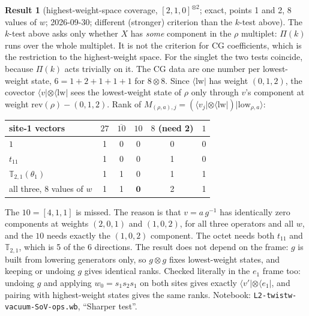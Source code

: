 \documentclass[11pt]{article}
\newcommand{\nb}[1]{\texttt{#1}}
\theoremstyle{definition}
\newtheorem{result}{Result}
\theoremstyle{remark}
\begin{document}
\begin{result}[{highest-weight-space coverage, $[2,1,0]^{\otimes2}$; exact, points 1 and 2, 8 values of $w$; 2026-09-30; different (stronger) criterion than the $k$-test above}]
The $k$-test above asks only whether $X$ has \emph{some} component in the $\rho$ multiplet: $\Pi(k)$ runs over the whole multiplet. It is not the criterion for CG coefficients, which is the restriction to the highest-weight space. For the singlet the two tests coincide, because $\Pi(k)$ acts trivially on it. The CG data are one number per lowest-weight state, $6=1+2+1+1+1$ for $8\otimes8$. Since $\langle\mathrm{lw}|$ has weight $(0,1,2)$, the covector $\langle v|\otimes\langle\mathrm{lw}|$ sees the lowest-weight state of $\rho$ only through $v$'s component at weight $\mathrm{rev}(\rho)-(0,1,2)$. Rank of $M_{(\rho,a),j}=(\langle v_j|\otimes\langle\mathrm{lw}|)|\mathrm{low}_{\rho,a}\rangle$:
\begin{center}
\begin{tabular}{lccccc}\toprule
site-1 vectors & $27$ & $\overline{10}$ & $10$ & $8$ (need 2) & $1$\\\midrule
$1$ & 1 & 0 & 0 & 0 & 0\\
$t_{11}$ & 1 & 0 & 0 & 1 & 0\\
$\mathbb T_{2,1}(\theta_1)$ & 1 & 1 & 0 & 1 & 1\\
all three, 8 values of $w$ & 1 & 1 & $\mathbf 0$ & 2 & 1\\\bottomrule
\end{tabular}
\end{center}
The $10=[4,1,1]$ is missed. The reason is that $v=a\,g^{-1}$ has identically zero components at weights $(2,0,1)$ and $(1,0,2)$, for all three operators and all $w$, and the $10$ needs exactly the $(1,0,2)$ component. The octet needs both $t_{11}$ and $\mathbb T_{2,1}$, which is 5 of the 6 directions. The result does not depend on the frame: $g$ is built from lowering generators only, so $g\otimes g$ fixes lowest-weight states, and keeping or undoing $g$ gives identical ranks. Checked literally in the $e_1$ frame too: undoing $g$ and applying $w_0=s_1s_2s_1$ on both sites gives exactly $\langle v'|\otimes\langle e_1|$, and pairing with highest-weight states gives the same ranks. Notebook: \nb{L2-twistw-vacuum-SoV-ops.wb}, ``Sharper test''.
\end{result}

\end{document}
